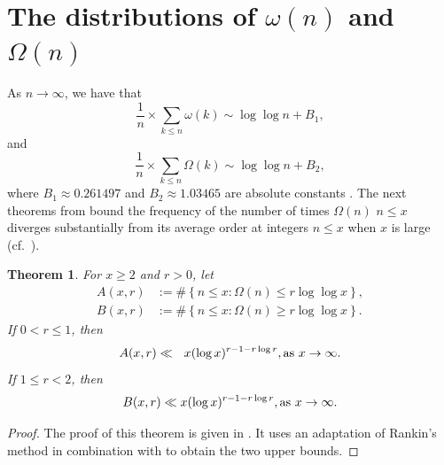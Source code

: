 \documentclass[11pt,reqno,a4letter]{article}
\numberwithin{equation}{section}
\numberwithin{figure}{section}
\numberwithin{table}{section}
\newcommand{\cf}{cf.~}
\theoremstyle{plain}
\newtheorem{theorem}{Theorem}
\numberwithin{theorem}{section}
\theoremstyle{definition}
\theoremstyle{remark}
\newcommand{\mathtext}[1]{\text{\rm #1}}
\begin{document}
\appendix
{}
\setcounter{section}{0} 
\renewcommand{\thesection}{\Alph{section}} 
\newpage

\section{The distributions of $\omega(n)$ and $\Omega(n)$} 
\label{subSection_TheKnownDistsOfThePrimeOmegaFunctions_IntroResults_v1} 

As $n \rightarrow \infty$, we have that 
$$\frac{1}{n} \times \sum_{k \leq n} \omega(k) \sim \log\log n + B_1,$$ 
and 
$$\frac{1}{n} \times \sum_{k \leq n} \Omega(k) \sim \log\log n + B_2,$$ 
where $B_1 \approx 0.261497$ and $B_2 \approx 1.03465$ are 
absolute constants \cite[\S 22.10]{HARDYWRIGHT}. 
The next theorems from \cite[\S 7.4]{MV} bound the frequency of the 
number of times $\Omega(n)$ $n \leq x$ 
diverges substantially from its average order at integers $n \leq x$ 
when $x$ is large 
(\cf \cite{ERDOS-KAC-REF,BILLINGSLY-CLT-PRIMEDIVFUNC}). 

\begin{theorem} 
\label{theorem_MV_Thm7.20-init_stmt} 
For $x \geq 2$ and $r > 0$, let 
\begin{align*} 
A(x, r) & := \#\left\{n \leq x: \Omega(n) \leq r \log\log x\right\}, \\ 
B(x, r) & := \#\left\{n \leq x: \Omega(n) \geq r \log\log x\right\}. 
\end{align*} 
If $0 < r \leq 1$, then 
\[
A(x, r) \ll\phantom{_R} x (\log x)^{r-1 - r\log r}, \mathtext{ as } x \rightarrow \infty. 
\]
If $1 \leq r < 2$, then 
\[
B(x, r) \ll x (\log x)^{r-1-r \log r}, \mathtext{ as } x \rightarrow \infty. 
\]
\end{theorem} 
\begin{proof}
The proof of this theorem is given in \cite[Thm.~7.20; \S 7.4]{MV}. 
It uses an adaptation of Rankin's method in combination with 
\cite[Thm.~7.18; \S 7.4]{MV} to obtain the two upper bounds. 
\end{proof}
\end{document}
